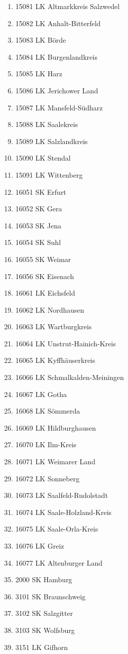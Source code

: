 \begin{enumerate}[itemsep=-6mm]
\item 15081 LK Altmarkkreis Salzwedel
\item 15082 LK Anhalt-Bitterfeld
\item 15083 LK Börde
\item 15084 LK Burgenlandkreis
\item 15085 LK Harz
\item 15086 LK Jerichower Land
\item 15087 LK Mansfeld-Südharz
\item 15088 LK Saalekreis
\item 15089 LK Salzlandkreis
\item 15090 LK Stendal
\item 15091 LK Wittenberg
\item 16051 SK Erfurt
\item 16052 SK Gera
\item 16053 SK Jena
\item 16054 SK Suhl
\item 16055 SK Weimar
\item 16056 SK Eisenach
\item 16061 LK Eichsfeld
\item 16062 LK Nordhausen
\item 16063 LK Wartburgkreis
\item 16064 LK Unstrut-Hainich-Kreis
\item 16065 LK Kyffhäuserkreis
\item 16066 LK Schmalkalden-Meiningen
\item 16067 LK Gotha
\item 16068 LK Sömmerda
\item 16069 LK Hildburghausen
\item 16070 LK Ilm-Kreis
\item 16071 LK Weimarer Land
\item 16072 LK Sonneberg
\item 16073 LK Saalfeld-Rudolstadt
\item 16074 LK Saale-Holzland-Kreis
\item 16075 LK Saale-Orla-Kreis
\item 16076 LK Greiz
\item 16077 LK Altenburger Land
\item 2000 SK Hamburg
\item 3101 SK Braunschweig
\item 3102 SK Salzgitter
\item 3103 SK Wolfsburg
\item 3151 LK Gifhorn

\end{enumerate}

